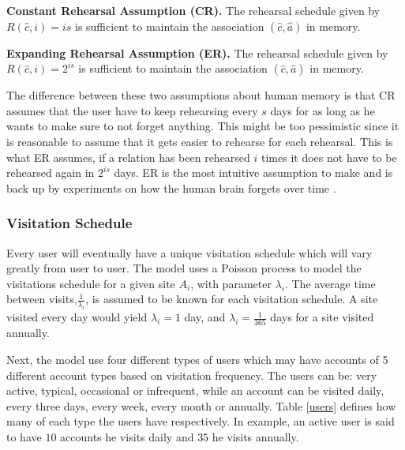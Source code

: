 \begin{requirement}\label{CR}
    \textbf{ Constant Rehearsal Assumption (CR)\cite{naturally-rehearsing}.} The rehearsal schedule given by $R(\hat c, i) = i s$ is sufficient to maintain the association $(\hat c, \hat a)$ in memory.
\end{requirement}

\begin{requirement}\label{ER}
    \textbf{Expanding Rehearsal Assumption (ER)\cite{naturally-rehearsing}.} The rehearsal schedule given by $R(\hat c, i)=2^{i s}$ is sufficient to maintain the association $(\hat c, \hat a)$ in memory.
\end{requirement}

The difference between these two assumptions about human memory is that CR assumes that the user have to keep rehearsing every $s$ days for as long as he wants to make sure to not forget anything. This might be too pessimistic since it is reasonable to assume that it gets easier to rehearse for each rehearsal. This is what ER assumes, if a relation has been rehearsed $i$ times it does not have to be rehearsed again in $2^{i s}$ days. ER is the most intuitive assumption to make and is back up by experiments on how the human brain forgets over time \cite{forgetting, human memory}.

\par 
\subsubsection{Visitation Schedule}
Every user will eventually have a unique visitation schedule which will vary greatly from user to user. The model uses a Poisson process to model the visitations schedule for a given site $A_i$, with parameter $\lambda_i$. The average time between visits,$\frac{1}{\lambda_i}$, is assumed to be known for each visitation schedule. A site visited every day would yield $\lambda_i = 1$ day, and $\lambda_i=\frac{1}{365}$ days for a site visited annually. 
\par Next, the model use four different types of users which may have accounts of 5 different account types based on visitation frequency. The users can be: very active, typical, occasional or infrequent, while an account can be visited daily, every three days, every week, every month or annually. Table \ref{users} defines how many of each type the users have respectively. In example, an active user is said to have $10$ accounts he visits daily and $35$ he visits annually.

